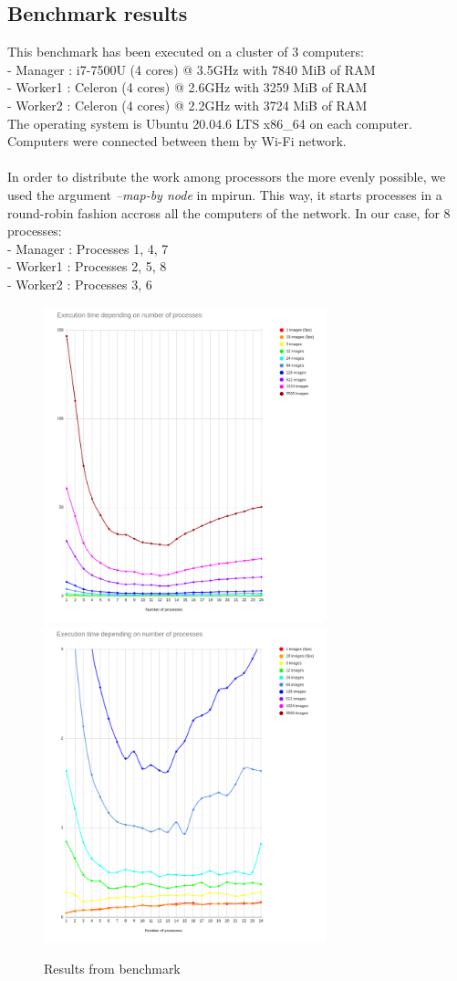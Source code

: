 \subsection{Benchmark results}
This benchmark has been executed on a cluster of 3 computers:\\
 - Manager : i7-7500U (4 cores) @ 3.5GHz with 7840 MiB of RAM\\
 - Worker1 : Celeron (4 cores) @ 2.6GHz with 3259 MiB of RAM\\
 - Worker2 : Celeron (4 cores) @ 2.2GHz with 3724 MiB of RAM\\
The operating system is Ubuntu 20.04.6 LTS x86\_64 on each computer. Computers were connected between them by Wi-Fi network.\\
\\
In order to distribute the work among processors the more evenly possible, we used the argument \emph{--map-by node} in mpirun. This way, it starts processes in a round-robin fashion accross all the computers of the network. In our case, for 8 processes:\\
- Manager : Processes 1, 4, 7\\
- Worker1 : Processes 2, 5, 8\\
- Worker2 : Processes 3, 6\\
\begin{figure}[H]
    \centering
    \includegraphics[width=8.2cm]{images/perfsAverage.png}
    \includegraphics[width=8.2cm]{images/perfsAverageZoomed.png}
    \caption{Results from benchmark}
    \label{fig:benchmarkResAverage}
\end{figure}
